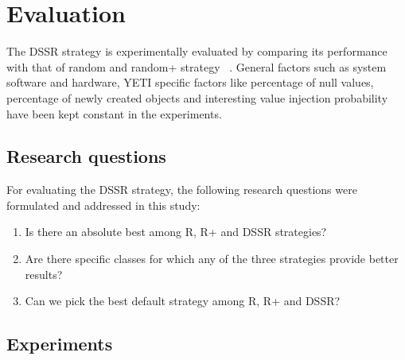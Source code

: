 \documentclass[conference]{IEEEtran}
\begin{document}








\section{Evaluation}\label{sec:eval}

The DSSR strategy is experimentally evaluated by comparing its performance with that of random and random+ strategy ~\cite{Leitner2007}. General factors such as system software and hardware, YETI specific factors like percentage of null values, percentage of newly created objects and interesting value injection probability have been kept constant in the experiments.

\subsection{Research questions}
For evaluating the DSSR strategy, the following research questions were formulated and addressed in this study:
\begin{enumerate}
\item Is there an absolute best among R, R+ and DSSR strategies?
\item Are there specific classes for which any of the three strategies provide better results?
\item Can we pick the best default strategy among R, R+ and DSSR?
\end{enumerate}



\subsection{Experiments}
\end{document}
